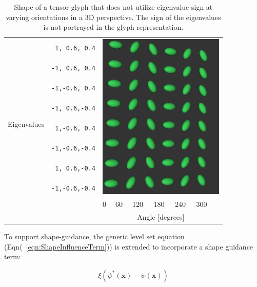 \documentclass{InsightArticle}
\begin{document}
\begin{table}[ht]
  \begin{tabular}{cc p{0.01cm}p{0.4cm}p{0.5cm}p{0.5cm}p{0.5cm}p{0.5cm}p{0.5cm}}
    \hline
    \multirow{9}{*}{Eigenvalues}
    &\texttt{ 1, 0.6, 0.4}&\multicolumn{7}{l}{\multirow{8}{*}{\includegraphics[width=6cm]{TensorGlyphMatrix}}} \\
    &\texttt{-1, 0.6, 0.4}& & & & & & & \\
    &\texttt{-1,-0.6, 0.4}& & & & & & & \\
    &\texttt{-1, 0.6,-0.4}& & & & & & & \\
    &\texttt{ 1,-0.6, 0.4}& & & & & & & \\
    &\texttt{-1,-0.6,-0.4}& & & & & & & \\
    &\texttt{ 1, 0.6,-0.4}& & & & & & & \\
    &\texttt{-1,-0.6,-0.4}& & & & & & & \\
    \hline
    \multicolumn{2}{c}{}& & 0 & 60 & 120 & 180 & 240 & 300 \\ [-1.1em]
    \multicolumn{2}{c}{}& \multicolumn{7}{c}{Angle [degrees]} \\
    \cline{3-9}
  \end{tabular}
  \caption{Shape of a tensor glyph that does not utilize eigenvalue sign at
    varying orientations in a 3D perspective. The sign of the eigenvalues is
    not portrayed in the glyph representation.}
  \label{tab:unsigned-flavors}
\end{table}


%
%


To support shape-guidance, the generic level set equation
(Eqn(~\ref{eqn:ShapeInfluenceTerm})) is extended to incorporate a shape guidance
term:

\begin{equation}
\label{eqn:ShapeInfluenceTerm}
\xi \left(\psi^{*}(\mathbf{x}) - \psi(\mathbf{x})\right)
\end{equation}




%
%



\end{document}
